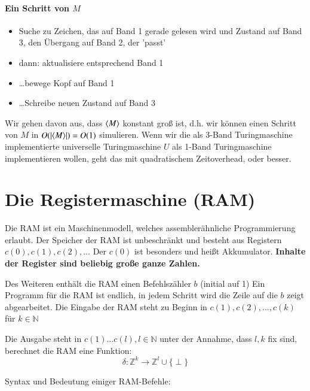 \paragraph*{Ein Schritt von $M$}
\begin{itemize}
	\item Suche zu Zeichen, das auf Band 1 gerade gelesen wird und Zustand auf Band 3, den Übergang auf Band 2, der 'passt'
	\item dann: aktualisiere entsprechend Band 1
	\item \dots bewege Kopf auf Band 1
	\item \dots Schreibe neuen Zustand auf Band 3
\end{itemize}

Wir gehen davon aus, dass $\langle M \rangle$ konstant groß ist, d.h. wir können einen Schritt von $M$ in $O(|\langle M \rangle|)=O(1)$ simulieren. Wenn wir die als 3-Band Turingmaschine implementierte universelle Turingmaschine $U$ als 1-Band Turingmaschine implementieren wollen, geht das mit quadratischem Zeitoverhead, oder besser.

\section{Die Registermaschine (RAM)}
Die RAM ist ein Maschinenmodell, welches assemblerähnliche Programmierung erlaubt. Der Speicher der RAM ist unbeschränkt und besteht aus Registern $c(0),c(1),c(2),\dots$ Der $c(0)$ ist besonders und heißt Akkumulator. \textbf{Inhalte der Register sind beliebig große ganze Zahlen.}

\par\medskip
Des Weiteren enthält die RAM einen Befehlszähler $b$ (initial auf 1) %
Ein Programm für die RAM ist endlich, in jedem Schritt wird die Zeile auf die $b$ zeigt abgearbeitet. Die Eingabe der RAM steht zu Beginn in $c(1),c(2),\dots,c(k)$ für $k \in \mathbb{N}$\par\medskip

Die Ausgabe steht in $c(1)\dots c(l), l \in \mathbb{N}$ unter der Annahme, dass $l,k$ fix sind, berechnet die RAM eine Funktion: $$\delta:\mathbb{Z}^k \rightarrow \mathbb{Z}^l \cup \{ \perp \}$$
\par\medskip

\newpage

Syntax und Bedeutung einiger RAM-Befehle:\par\medskip

